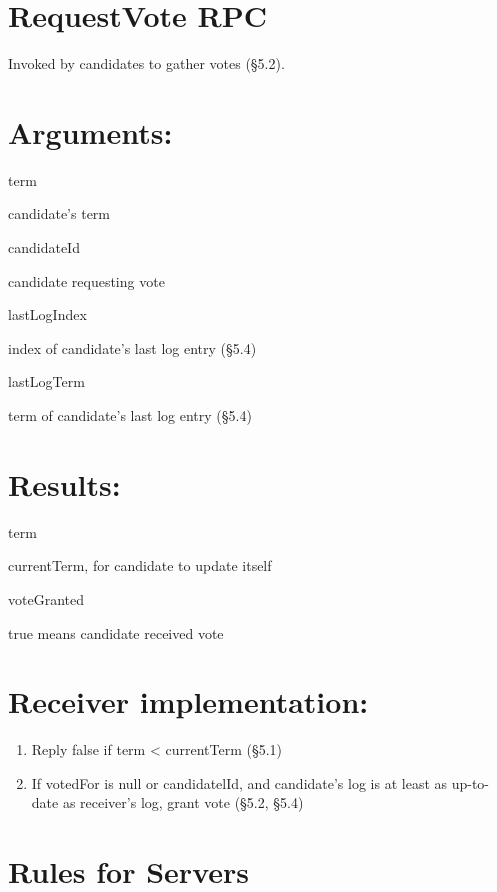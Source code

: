 \documentclass[
]{article}
\providecommand{\tightlist}{%
  \setlength{\itemsep}{0pt}\setlength{\parskip}{0pt}}
\begin{document}
\section{RequestVote RPC}\label{requestvote-rpc}

Invoked by candidates to gather votes (§5.2).

\section{Arguments:}\label{arguments-1}

term

candidate's term

candidateId

candidate requesting vote

lastLogIndex

index of candidate's last log entry (§5.4)

lastLogTerm

term of candidate's last log entry (§5.4)

\section{Results:}\label{results-1}

term

currentTerm, for candidate to update itself

voteGranted

true means candidate received vote

\section{Receiver implementation:}\label{receiver-implementation-1}

\begin{enumerate}
\def\labelenumi{\arabic{enumi}.}
\tightlist
\item
  Reply false if term \textless{} currentTerm (§5.1)\\
\item
  If votedFor is null or candidatelId, and candidate's log is at least
  as up-to-date as receiver's log, grant vote (§5.2, §5.4)
\end{enumerate}

\section{Rules for Servers}\label{rules-for-servers}
\end{document}
